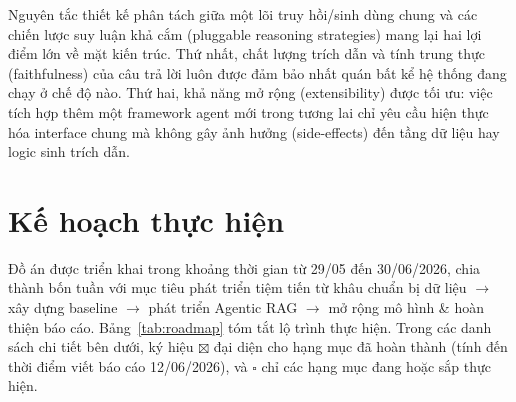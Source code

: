 \documentclass[11pt]{article}
\begin{document}
Nguyên tắc thiết kế phân tách giữa một lõi truy hồi/sinh dùng chung và các chiến lược suy luận khả cắm (pluggable reasoning strategies) mang lại hai lợi điểm lớn về mặt kiến trúc. Thứ nhất, chất lượng trích dẫn và tính trung thực (faithfulness) của câu trả lời luôn được đảm bảo nhất quán bất kể hệ thống đang chạy ở chế độ nào. Thứ hai, khả năng mở rộng (extensibility) được tối ưu: việc tích hợp thêm một framework agent mới trong tương lai chỉ yêu cầu hiện thực hóa interface chung mà không gây ảnh hưởng (side-effects) đến tầng dữ liệu hay logic sinh trích dẫn.
\section{Kế hoạch thực hiện}
\label{sec:plan}

Đồ án được triển khai trong khoảng thời gian từ 29/05 đến 30/06/2026, chia thành bốn tuần với mục tiêu phát triển tiệm tiến từ khâu chuẩn bị dữ liệu \(\rightarrow\) xây dựng baseline \(\rightarrow\) phát triển Agentic RAG \(\rightarrow\) mở rộng mô hình \& hoàn thiện báo cáo. Bảng~\ref{tab:roadmap} tóm tắt lộ trình thực hiện. Trong các danh sách chi tiết bên dưới, ký hiệu \(\boxtimes\) đại diện cho hạng mục đã hoàn thành (tính đến thời điểm viết báo cáo 12/06/2026), và \(\square\) chỉ các hạng mục đang hoặc sắp thực hiện.
\end{document}
